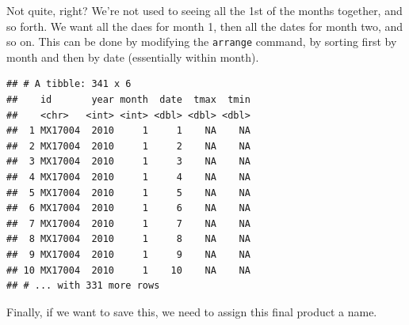 \documentclass[12pt,letterpaperpaper,openany]{book}
\newenvironment{Shaded}{\begin{snugshade}}{\end{snugshade}}
\newcommand{\DataTypeTok}[1]{\textcolor[rgb]{0.13,0.29,0.53}{#1}}
\newcommand{\KeywordTok}[1]{\textcolor[rgb]{0.13,0.29,0.53}{\textbf{#1}}}
\newcommand{\NormalTok}[1]{#1}
\newcommand{\OperatorTok}[1]{\textcolor[rgb]{0.81,0.36,0.00}{\textbf{#1}}}
\newcommand{\StringTok}[1]{\textcolor[rgb]{0.31,0.60,0.02}{#1}}
\begin{document}
Not quite, right? We're not used to seeing all the 1st of the months together, and so forth. We want all the daes for month 1, then all the dates for month two, and so on. This can be done by modifying the \texttt{arrange} command, by sorting first by month and then by date (essentially within month).

\begin{Shaded}
\end{Shaded}

\begin{verbatim}
## # A tibble: 341 x 6
##    id       year month  date  tmax  tmin
##    <chr>   <int> <int> <dbl> <dbl> <dbl>
##  1 MX17004  2010     1     1    NA    NA
##  2 MX17004  2010     1     2    NA    NA
##  3 MX17004  2010     1     3    NA    NA
##  4 MX17004  2010     1     4    NA    NA
##  5 MX17004  2010     1     5    NA    NA
##  6 MX17004  2010     1     6    NA    NA
##  7 MX17004  2010     1     7    NA    NA
##  8 MX17004  2010     1     8    NA    NA
##  9 MX17004  2010     1     9    NA    NA
## 10 MX17004  2010     1    10    NA    NA
## # ... with 331 more rows
\end{verbatim}

Finally, if we want to save this, we need to assign this final product a name.

\begin{Shaded}
\end{Shaded}
\end{document}
